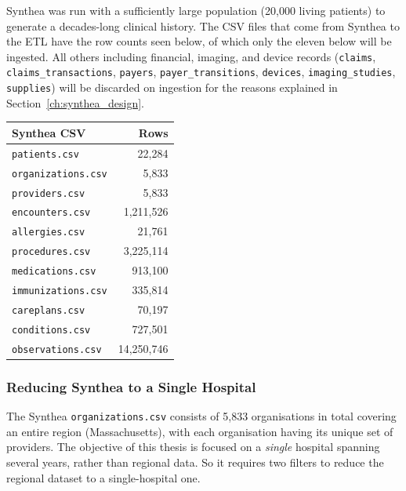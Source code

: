 Synthea was run with a sufficiently large population (20{,}000 living patients) to generate a decades-long clinical history. The CSV files that come from Synthea to the ETL have the row counts seen below, of which only the eleven below will be ingested. All others including financial, imaging, and device records (\texttt{claims}, \texttt{claims\_transactions}, \texttt{payers}, \texttt{payer\_transitions}, \texttt{devices}, \texttt{imaging\_studies}, \texttt{supplies}) will be discarded on ingestion for the reasons explained in Section~\ref{ch:synthea_design}.

\begin{center}
\begin{tabular}{lr}
\hline
\textbf{Synthea CSV} & \textbf{Rows} \\
\hline
\texttt{patients.csv}        &        22,284 \\
\texttt{organizations.csv}   &         5,833 \\
\texttt{providers.csv}       &         5,833 \\
\texttt{encounters.csv}      &     1,211,526 \\
\texttt{allergies.csv}       &        21,761 \\
\texttt{procedures.csv}      &     3,225,114 \\
\texttt{medications.csv}     &       913,100 \\
\texttt{immunizations.csv}   &       335,814 \\
\texttt{careplans.csv}       &        70,197 \\
\texttt{conditions.csv}      &       727,501 \\
\texttt{observations.csv}    &    14,250,746 \\
\hline
\end{tabular}
\end{center}

\subsubsection*{Reducing Synthea to a Single Hospital}

The Synthea \texttt{organizations.csv} consists of 5,833 organisations in total covering an entire region (Massachusetts), with each organisation having its unique set of providers. The objective of this thesis is focused on a \emph{single} hospital spanning several years, rather than regional data. So it requires two filters to reduce the regional dataset to a single-hospital one.

